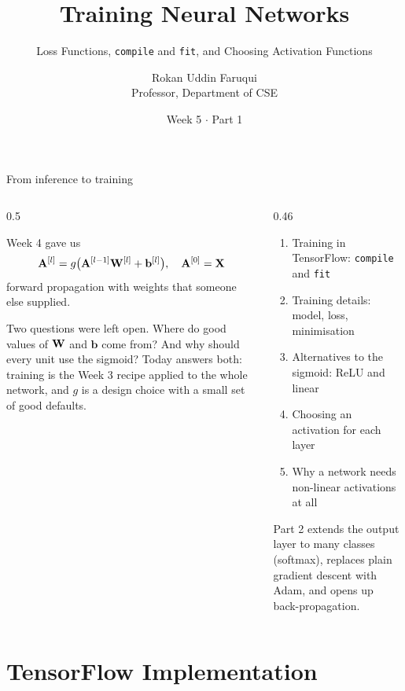 \documentclass[aspectratio=169,10pt]{beamer}
\title[CSE 815 -- Week 5, Part 1]{Training Neural Networks}
\subtitle{Loss Functions, \texttt{compile} and \texttt{fit}, and Choosing Activation Functions}
\author{Rokan Uddin Faruqui\\ \small Professor, Department of CSE}
\institute{\small University of Chittagong \\ \texttt{rufaruqui@cu.ac.bd}}
\date[Week 5 / Part 1]{Week 5 $\cdot$ Part 1}
\begin{document}
\begin{frame}
  \titlepage
\end{frame}

\begin{frame}{From inference to training}
  \begin{columns}[T,onlytextwidth]
    \begin{column}{0.5\textwidth}
      \begin{block}{Week 4 gave us}
        \[ \mathbf{A}^{[l]} = g\bigl(\mathbf{A}^{[l-1]}\mathbf{W}^{[l]}+\mathbf{b}^{[l]}\bigr),
           \quad \mathbf{A}^{[0]}=\mathbf{X} \]
        forward propagation with weights that someone else supplied.
      \end{block}
      \footnotesize
      Two questions were left open. Where do good values of $\mathbf{W}$ and $\mathbf{b}$ come
      from? And why should every unit use the sigmoid? Today answers both: training is the
      Week 3 recipe applied to the whole network, and $g$ is a design choice with a small set
      of good defaults.
    \end{column}
    \begin{column}{0.46\textwidth}
      \begin{keyidea}[Today]
        \footnotesize
        \begin{enumerate}
          \item Training in TensorFlow: \texttt{compile} and \texttt{fit}
          \item Training details: model, loss, minimisation
          \item Alternatives to the sigmoid: ReLU and linear
          \item Choosing an activation for each layer
          \item Why a network needs non-linear activations at all
        \end{enumerate}
      \end{keyidea}
      \footnotesize Part 2 extends the output layer to many classes (softmax), replaces
      plain gradient descent with Adam, and opens up back-propagation.
    \end{column}
  \end{columns}
\end{frame}

\section{TensorFlow Implementation}
\end{document}
